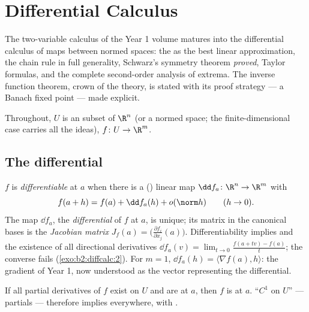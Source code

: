 \chapter{Differential Calculus}\label{ch:b2:diffcalc}

The two-variable calculus of the Year 1 volume matures into the
differential calculus of maps between normed spaces: the
\emph{} as the best linear approximation, the chain rule
in full generality, Schwarz's symmetry theorem \emph{proved}, Taylor
formulas, and the complete second-order analysis of extrema. The
inverse function theorem, crown of the theory, is stated with its
proof strategy --- a Banach fixed point --- made explicit.

Throughout, $U$ is an  subset of $\R^n$ (or a normed space; the
finite-dimensional case carries all the ideas), $f \colon U \to
\R^m$.

\section{The differential}

\begin{definition}\label{def:b2:diffcalc:differential}
$f$ is \emph{differentiable} at $a$ when there
is a () linear map $\dd f_a \colon \R^n \to \R^m$ with
\[
f(a + h) = f(a) + \dd f_a(h) + o(\norm h)
\qquad (h \to 0).
\]
The map $\dd f_a$, the \emph{differential} of
$f$ at $a$, is unique; its matrix in the canonical bases is
the \emph{Jacobian matrix} $J_f(a) =
\bigl(\frac{\partial f_i}{\partial x_j}(a)\bigr)$.
Differentiability implies  and the existence of all
directional derivatives $\dd f_a(v) = \lim_{t\to0}\frac{f(a + tv)
- f(a)}{t}$; the converse fails
(\cref{exo:b2:diffcalc:2}). For $m = 1$, $\dd f_a(h) = \langle
\nabla f(a), h\rangle$: the gradient of Year 1, now understood as
the vector representing the differential.
\end{definition}

\begin{theorem}[$C^1$ criterion]\label{thm:b2:diffcalc:c1}
If all partial derivatives of $f$ exist on $U$ and are 
at $a$, then $f$ is  at $a$. ``$C^1$ on $U$'' ---
 partials --- therefore implies 
everywhere, with  .
\end{theorem}

